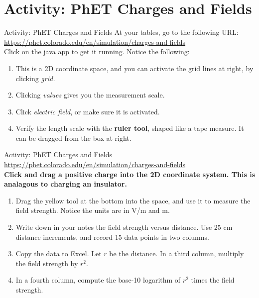 \documentclass{beamer}
\begin{document}
\section{Activity: PhET Charges and Fields}

\begin{frame}{Activity: PhET Charges and Fields}
At your tables, go to the following URL: \\ \vspace{0.2cm}
\url{https://phet.colorado.edu/en/simulation/charges-and-fields} \\ \vspace{0.2cm}
Click on the java app to get it running.  Notice the following:
\begin{enumerate}
\item This is a 2D coordinate space, and you can activate the grid lines at right, by clicking \textit{grid.}
\item Clicking \textit{values} gives you the measurement scale.
\item Click \textit{electric field}, or make sure it is activated.
\item Verify the length scale with the \textbf{ruler tool}, shaped like a tape measure.  It can be dragged from the box at right.
\end{enumerate}
\end{frame}

\begin{frame}{Activity: PhET Charges and Fields}
\small
\url{https://phet.colorado.edu/en/simulation/charges-and-fields} \\ \vspace{0.2cm}
\textbf{Click and drag a positive charge into the 2D coordinate system.  This is analagous to charging an insulator.}
\begin{enumerate}
\item Drag the yellow tool at the bottom into the space, and use it to measure the field strength.  Notice the units are in V/m and m.
\item Write down in your notes the field strength versus distance.  Use 25 cm distance increments, and record 15 data points in two columns.
\item Copy the data to Excel. Let $r$ be the distance. In a third column, multiply the field strength by $r^{2}$.
\item In a fourth column, compute the base-10 logarithm of $r^2$ times the field strength.
\end{enumerate}
\end{frame}
\end{document}
